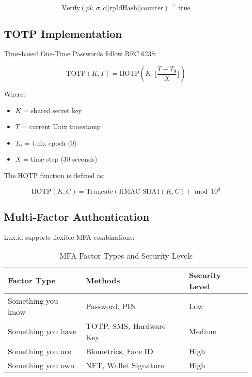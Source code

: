 \documentclass[11pt,a4paper]{article}
\begin{document}
\begin{equation}
    \text{Verify}(pk, \sigma, c || \text{rpIdHash} || \text{counter}) \stackrel{?}{=} \text{true}
\end{equation}

\subsection{TOTP Implementation}

Time-based One-Time Passwords follow RFC 6238:

\begin{equation}
    \text{TOTP}(K, T) = \text{HOTP}(K, \lfloor \frac{T - T_0}{X} \rfloor)
\end{equation}

Where:
\begin{itemize}
    \item $K$ = shared secret key
    \item $T$ = current Unix timestamp
    \item $T_0$ = Unix epoch (0)
    \item $X$ = time step (30 seconds)
\end{itemize}

The HOTP function is defined as:

\begin{equation}
    \text{HOTP}(K, C) = \text{Truncate}(\text{HMAC-SHA1}(K, C)) \bmod 10^d
\end{equation}

\subsection{Multi-Factor Authentication}

Lux.id supports flexible MFA combinations:

\begin{table}[h]
\centering
\begin{tabular}{|l|l|l|}
\hline
\textbf{Factor Type} & \textbf{Methods} & \textbf{Security Level} \\
\hline
Something you know & Password, PIN & Low \\
Something you have & TOTP, SMS, Hardware Key & Medium \\
Something you are & Biometrics, Face ID & High \\
Something you own & NFT, Wallet Signature & High \\
\hline
\end{tabular}
\caption{MFA Factor Types and Security Levels}
\end{table}
\end{document}
